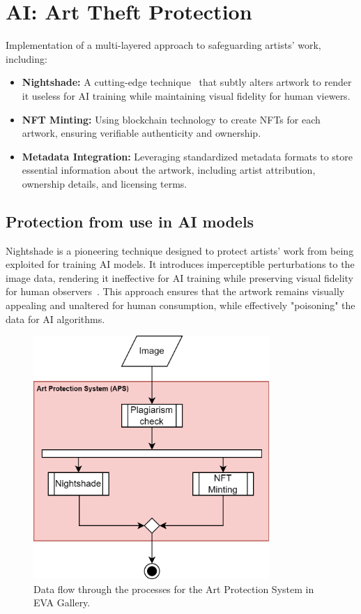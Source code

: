 \newpage

\section{AI: Art Theft Protection}
Implementation of a multi-layered approach to safeguarding artists' work, including:

    \begin{itemize}
        \item \textbf{Nightshade:} A cutting-edge technique~\cite{shan2024nightshade} that subtly alters artwork to render it useless for AI training while maintaining visual fidelity for human viewers.
        \item \textbf{NFT Minting:} Using blockchain technology to create NFTs for each artwork, ensuring verifiable authenticity and ownership.
        \item \textbf{Metadata Integration:} Leveraging standardized metadata formats to store essential information about the artwork, including artist attribution, ownership details, and licensing terms.
    \end{itemize}

\subsection{Protection from use in AI models}

Nightshade is a pioneering technique designed to protect artists' work from being exploited for training AI models. It introduces imperceptible perturbations to the image data, rendering it ineffective for AI training while preserving visual fidelity for human observers~\cite{shan2024nightshade}. This approach ensures that the artwork remains visually appealing and unaltered for human consumption, while effectively "poisoning" the data for AI algorithms.

\begin{figure}[ht]
    \centering
    \includegraphics[width=0.8\textwidth]{figs/aps.png}
    \caption{Data flow through the processes for the Art Protection System in EVA Gallery.}
    \label{fig:data_flow}
\end{figure}

